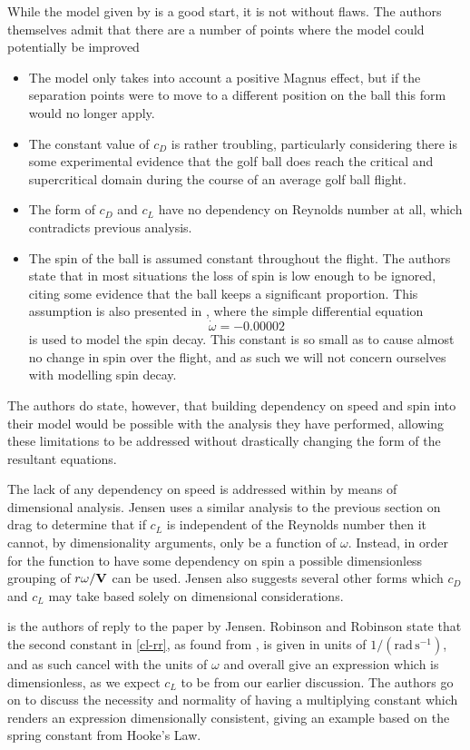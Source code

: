 While the model given by \citet{Robinson2013} is a good start, it is not without flaws. The authors
themselves admit that there are a number of points where the model could potentially be improved
\begin{itemize}
\item The model only takes into account a positive Magnus effect, but if the separation points were
to move to a different position on the ball this form would no longer apply.
\item The constant value of $c_D$ is rather troubling, particularly considering there is some experimental
evidence that the golf ball does reach the critical and supercritical domain during the course of an
average golf ball flight.
\item The form of $c_D$ and $c_L$ have no dependency on Reynolds number at all, which contradicts previous
analysis.
\item The spin of the ball is assumed constant throughout the flight. The authors state that in most
situations the loss of spin is low enough to be ignored, citing some evidence that the ball keeps a
significant proportion. This assumption is also presented in \citet{Lieberman2001}, where the simple
differential equation
\[
\dot{\omega} = -0.00002
\]
is used to model the spin decay. This constant is so small as to cause almost no change in spin over
the flight, and as such we will not concern ourselves with modelling spin decay.
\end{itemize}

The authors do state, however, that building dependency on speed and spin into their model would be
possible with the analysis they have performed, allowing these limitations to be addressed without 
drastically changing the form of the resultant equations.


The lack of any dependency on speed is addressed within \citet{Jensen2014Comment} by means of dimensional
analysis. Jensen uses a similar analysis to the previous section on drag to determine that if $c_L$ is
independent of the Reynolds number then it cannot, by dimensionality arguments, only be a function of
$\omega$. Instead, in order for the function to have some dependency on spin a possible dimensionless grouping
of $r\omega/\mathbf{V}$ can be used. Jensen also suggests several other forms which $c_D$ and $c_L$ may take
based solely on dimensional considerations.

\citet{Robinson2014Reply} is the authors of \citet{Robinson2013} reply to the paper by Jensen. Robinson
and Robinson state that the second constant in \eqref{cl-rr}, as found from \citet{davies1949aerodynamics},
is given in units of $1/(\text{rad} \,\text{s}^{-1})$, and as such cancel with the units of $\omega$ and 
overall give an expression which is dimensionless, as we expect $c_L$ to be from our earlier discussion.
The authors go on to discuss the necessity and normality of having a multiplying constant which renders
an expression dimensionally consistent, giving an example based on the spring constant from Hooke's 
Law.

